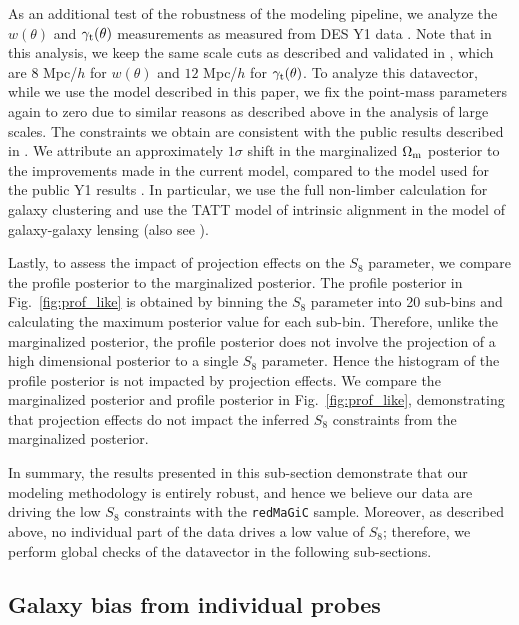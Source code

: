 \documentclass[aps, prd,twocolumn,superscriptaddress,nofootinbib,preprintnumbers]{revtex4-1}
\newcommand{\gammat}{\ensuremath{\gamma_{\rm t}(\theta)}}
\newcommand{\wtheta}{\ensuremath{w(\theta)}}
\newcommand{\redmagic}{\texttt{redMaGiC} }
\begin{document}
As an additional test of the robustness of the modeling pipeline, we analyze the $\wtheta$ and $\gammat$ measurements as measured from DES Y1 data \citep{Abbott_2018}. Note that in this analysis, we keep the same scale cuts as described and validated in \citet{Abbott_2018}, which are $8$ Mpc/$h$ for $\wtheta$ and $12$ Mpc/$h$ for $\gammat$. To analyze this datavector, while we use the model described in this paper, we fix the point-mass parameters again to zero due to similar reasons as described above in the analysis of large scales. The constraints we obtain are consistent with  the public results  described in \citet{Abbott_2018}. We attribute an approximately $1\sigma$ shift in the marginalized $\Omega_{\rm m}$ posterior to the improvements made in the current model, compared to the model used for the public Y1 results \citep{Krause2017}. In particular, we use the full non-limber calculation for galaxy clustering and use the TATT model of intrinsic alignment in the model of galaxy-galaxy lensing (also see \citet{Fang_nonlimber}). 

Lastly, to assess the impact of projection effects on the $S_8$ parameter, we compare the profile posterior to the marginalized posterior. The profile posterior in Fig.~\ref{fig:prof_like} is obtained by binning the $S_8$ parameter into 20 sub-bins and calculating the maximum posterior value for each sub-bin. Therefore, unlike the marginalized posterior, the profile posterior does not involve the projection of a high dimensional posterior to a single $S_8$ parameter. Hence the histogram of the profile posterior is not impacted by projection effects. We compare the marginalized posterior and profile posterior in Fig.~\ref{fig:prof_like}, demonstrating that projection effects do not impact the inferred $S_8$ constraints from the marginalized posterior.  
 
In summary,  the results presented in this sub-section demonstrate that our modeling methodology is entirely robust, and hence we believe our data are driving the low $S_8$ constraints with the \redmagic  sample. Moreover, as described above, no individual part of the data drives a low value of $S_8$; therefore, we perform global checks of the datavector in the following sub-sections.

\subsection{Galaxy bias from individual probes}
\end{document}
